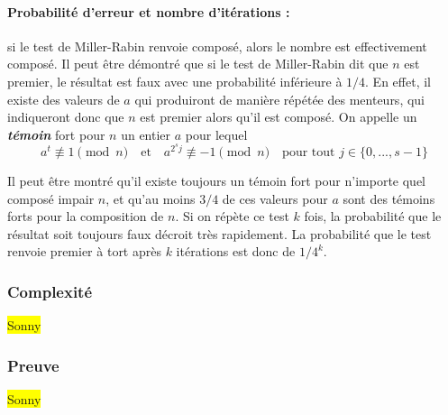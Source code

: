 	
		\paragraph{Probabilité d'erreur et nombre d'itérations :} si le test de Miller-Rabin renvoie composé, alors le nombre est effectivement composé. Il peut être démontré que si le test de Miller-Rabin dit que $n$ est premier, le résultat est faux avec une probabilité inférieure à $1/4$. En effet, il existe des valeurs de $a$ qui produiront de manière répétée des menteurs, qui indiqueront donc que $n$ est premier alors qu'il est composé. On appelle un \textit{\textbf{témoin}} fort pour $n$ un entier $a$ pour lequel
		\[a^{t} \not\equiv 1 \pmod n \quad \text{et} \quad a^{2^{s}j} \not\equiv -1 \pmod n \quad \text{pour tout } j \in \{0, ..., s - 1\}\]
		
		Il peut être montré qu'il existe toujours un témoin fort pour n'importe quel composé impair $n$, et qu'au moins $3/4$ de ces valeurs pour $a$ sont des témoins forts pour la composition de $n$. Si on répète ce test $k$ fois, la probabilité que le résultat soit toujours faux décroit très rapidement. La probabilité que le test renvoie premier à tort après $k$ itérations est donc de $1/4^{k}$.
		
	\subsubsection{Complexité}
		\colorbox{yellow}{Sonny}
	\subsubsection{Preuve}
		\colorbox{yellow}{Sonny}

